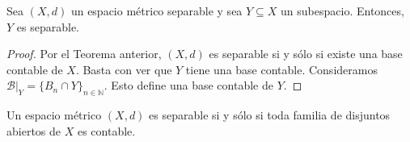 \begin{corollary}
	Sea $(X, d)$ un espacio métrico separable y sea $Y \subseteq X$ un subespacio. Entonces, $Y$ es separable.
\end{corollary}

\begin{proof}
	Por el Teorema anterior, $(X, d)$ es separable si y sólo si existe una base contable de $X$. Basta con ver que $Y$ tiene una base contable. Consideramos $\mathcal{B}|_Y = \{ B_n \cap Y\}_{n \in \mathbb{N}}$. Esto define una base contable de $Y$.
\end{proof}

\begin{proposition}
	Un espacio métrico $(X, d)$ es separable si y sólo si toda familia de disjuntos abiertos de $X$ es contable.
\end{proposition}

